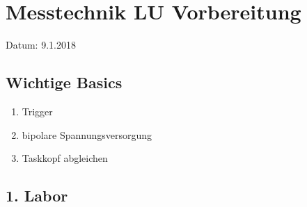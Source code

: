 \documentclass{article}
\begin{document}
\section*{Messtechnik LU Vorbereitung}
Datum: 9.1.2018

\subsection*{Wichtige Basics}
\begin{enumerate}
\item Trigger
\item bipolare Spannungsversorgung
\item Taskkopf abgleichen

\end{enumerate}
\subsection*{1. Labor }
\end{document}
